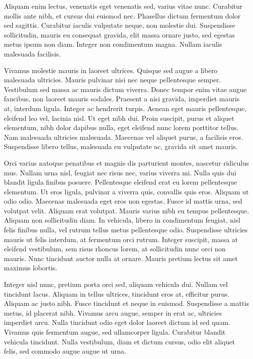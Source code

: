 Aliquam enim lectus, venenatis eget venenatis sed, varius vitae nunc. Curabitur mollis ante nibh, et cursus dui euismod nec. Phasellus dictum fermentum dolor sed sagittis. Curabitur iaculis vulputate neque, non molestie dui. Suspendisse sollicitudin, mauris eu consequat gravida, elit massa ornare justo, sed egestas metus ipsum non diam. Integer non condimentum magna. Nullam iaculis malesuada facilisis.

Vivamus molestie mauris in laoreet ultrices. Quisque sed augue a libero malesuada ultricies. Mauris pulvinar nisi nec neque pellentesque semper. Vestibulum sed massa ac mauris dictum viverra. Donec tempor enim vitae augue faucibus, non laoreet mauris sodales. Praesent a nisi gravida, imperdiet mauris at, interdum ligula. Integer ac hendrerit turpis. Aenean eget mauris pellentesque, eleifend leo vel, lacinia nisl. Ut eget nibh dui. Proin suscipit, purus et aliquet elementum, nibh dolor dapibus nulla, eget eleifend nunc lorem porttitor tellus. Nam malesuada ultricies malesuada. Maecenas vel aliquet purus, a facilisis eros. Suspendisse libero tellus, malesuada eu vulputate ac, gravida sit amet mauris.

Orci varius natoque penatibus et magnis dis parturient montes, nascetur ridiculus mus. Nullam urna nisl, feugiat nec risus nec, varius viverra mi. Nulla quis dui blandit ligula finibus posuere. Pellentesque eleifend erat eu lorem pellentesque elementum. Ut eros ligula, pulvinar a viverra quis, convallis quis eros. Aliquam ut odio odio. Maecenas malesuada eget eros non egestas. Fusce id mattis urna, sed volutpat velit. Aliquam erat volutpat. Mauris varius nibh eu tempus pellentesque. Aliquam non sollicitudin diam. In vehicula, libero in condimentum feugiat, nisl felis finibus nulla, vel rutrum tellus metus pellentesque odio. Suspendisse ultricies mauris ut felis interdum, at fermentum orci rutrum. Integer suscipit, massa at eleifend vestibulum, sem risus rhoncus lorem, at sollicitudin nunc orci non mauris. Nunc tincidunt auctor nulla at ornare. Mauris pretium lectus sit amet maximus lobortis.

Integer nisl nunc, pretium porta orci sed, aliquam vehicula dui. Nullam vel tincidunt lacus. Aliquam in tellus ultrices, tincidunt eros at, efficitur purus. Aliquam ac justo nibh. Fusce tincidunt et neque in euismod. Suspendisse a mattis metus, id placerat nibh. Vivamus arcu augue, semper in erat ac, ultricies imperdiet arcu. Nulla tincidunt odio eget dolor laoreet dictum id sed quam. Vivamus quis fermentum augue, sed ullamcorper ligula. Curabitur blandit vehicula tincidunt. Nulla vestibulum, diam et dictum cursus, odio elit aliquet felis, sed commodo augue augue ut urna.

